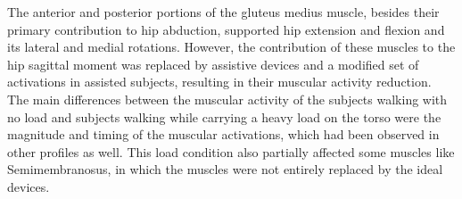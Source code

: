 \documentclass[10pt,letterpaper]{article}
\begin{document}
The anterior and posterior portions of the gluteus medius muscle, besides their primary contribution to hip abduction, supported hip extension and flexion and its lateral and medial rotations. However, the contribution of these muscles to the hip sagittal moment was replaced by assistive devices and a modified set of activations in assisted subjects, resulting in their muscular activity reduction.\\
The main differences between the muscular activity of the subjects walking with no load and subjects walking while carrying a heavy load on the torso were the magnitude and timing of the muscular activations, which had been observed in other profiles as well. This load condition also partially affected some muscles like Semimembranosus, in which the muscles were not entirely replaced by the ideal devices.
\end{document}
